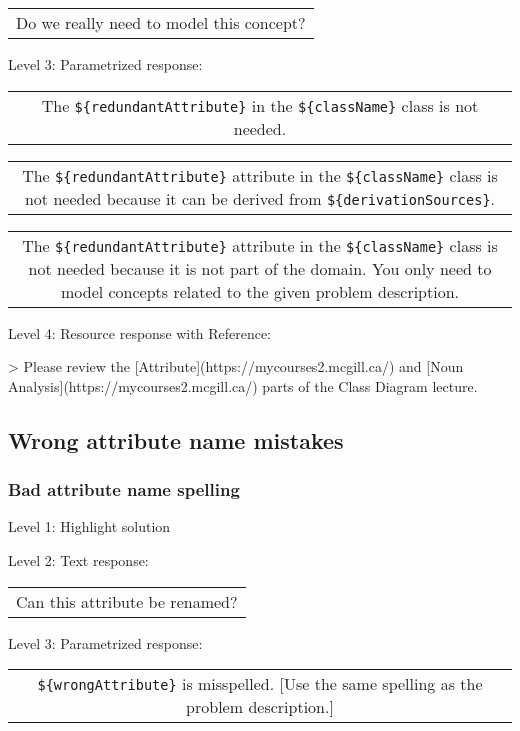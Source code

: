 \begin{tabular}{|c}
Do we really need to model this concept?
\end{tabular} \medskip

\noindent Level 3: Parametrized response: \medskip

\begin{tabular}{|c}
The \verb|${redundantAttribute}| in the \verb|${className}| class is not needed.
\end{tabular} \medskip

\begin{tabular}{|c}
The \verb|${redundantAttribute}| attribute in the \verb|${className}| class is not needed because it can be derived from \verb|${derivationSources}|.
\end{tabular} \medskip

\begin{tabular}{|c}
The \verb|${redundantAttribute}| attribute in the \verb|${className}| class is not needed because it is not part of the domain. You only need to model concepts related to the given problem description.
\end{tabular} \medskip

\noindent Level 4: Resource response with Reference:

> Please review the [Attribute](https://mycourses2.mcgill.ca/) and [Noun Analysis](https://mycourses2.mcgill.ca/) parts of the Class Diagram lecture.


\subsection{Wrong attribute name mistakes}

\subsubsection{Bad attribute name spelling}

\noindent Level 1: Highlight solution \medskip

\noindent Level 2: Text response: \medskip

\begin{tabular}{|c}
Can this attribute be renamed?
\end{tabular} \medskip

\noindent Level 3: Parametrized response: \medskip

\begin{tabular}{|c}
\verb|${wrongAttribute}| is misspelled. [Use the same spelling as the problem description.]
\end{tabular} \medskip

